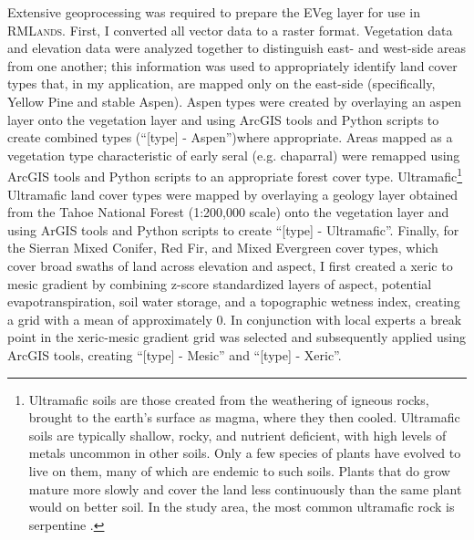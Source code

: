 Extensive geoprocessing was required to prepare the EVeg layer for use in \textsc{RMLands}. First, I converted all vector data to a raster format. Vegetation data and elevation data were analyzed together to distinguish east- and west-side areas from one another; this information was used to appropriately identify land cover types that, in my application, are mapped only on the east-side (specifically, Yellow Pine and stable Aspen). Aspen types were created by overlaying an aspen layer onto the vegetation layer and using ArcGIS tools and Python scripts to create combined types (``[type] - Aspen'')where appropriate. Areas mapped as a vegetation type characteristic of early seral (e.g. chaparral) were remapped using ArcGIS tools and Python scripts to an appropriate forest cover type. Ultramafic\footnote{Ultramafic soils are those created from the weathering of igneous rocks, brought to the earth's surface as magma, where they then cooled. Ultramafic soils are typically shallow, rocky, and nutrient deficient, with high levels of metals uncommon in other soils. Only a few species of plants have evolved to live on them, many of which are endemic to such soils. Plants that do grow mature more slowly and cover the land less continuously than the same plant would on better soil. In the study area, the most common ultramafic rock is serpentine \citep{Safford2004}.} Ultramafic land cover types were mapped by overlaying a geology layer obtained from the Tahoe National Forest (1:200,000 scale) onto the vegetation layer and using ArGIS tools and Python scripts to create ``[type] - Ultramafic''. Finally, for the Sierran Mixed Conifer, Red Fir, and Mixed Evergreen cover types, which cover broad swaths of land across elevation and aspect, I first created a xeric to mesic gradient by combining z-score standardized layers of aspect, potential evapotranspiration, soil water storage, and a topographic wetness index, creating a grid with a mean of approximately 0. In conjunction with local experts a break point in the xeric-mesic gradient grid was selected and subsequently applied using ArcGIS tools, creating ``[type] - Mesic'' and ``[type] - Xeric''. 



